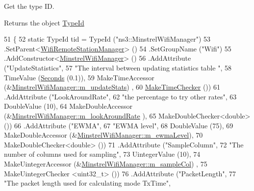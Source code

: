 Get the type ID. 

\begin{DoxyReturn}{Returns}
the object \hyperlink{classns3_1_1TypeId}{Type\+Id} 
\end{DoxyReturn}

\begin{DoxyCode}
51 \{
52   \textcolor{keyword}{static} TypeId tid = TypeId (\textcolor{stringliteral}{"ns3::MinstrelWifiManager"})
53     .SetParent<\hyperlink{classns3_1_1WifiRemoteStationManager_a78524840f5900e1937e8e2d6df48954d}{WifiRemoteStationManager}> ()
54     .SetGroupName (\textcolor{stringliteral}{"Wifi"})
55     .AddConstructor<\hyperlink{classns3_1_1MinstrelWifiManager_aabb10b7ccc2f7298fe491b00880954f4}{MinstrelWifiManager}> ()
56     .AddAttribute (\textcolor{stringliteral}{"UpdateStatistics"},
57                    \textcolor{stringliteral}{"The interval between updating statistics table "},
58                    TimeValue (\hyperlink{group__timecivil_ga33c34b816f8ff6628e33d5c8e9713b9e}{Seconds} (0.1)),
59                    MakeTimeAccessor (&\hyperlink{classns3_1_1MinstrelWifiManager_abd6d6339afd6875826c0ffa11297ad65}{MinstrelWifiManager::m\_updateStats})
      ,
60                    \hyperlink{group__time_ga7032965bd4afa578691d88c09e4481c1}{MakeTimeChecker} ())
61     .AddAttribute (\textcolor{stringliteral}{"LookAroundRate"},
62                    \textcolor{stringliteral}{"the percentage to try other rates"},
63                    DoubleValue (10),
64                    MakeDoubleAccessor (&\hyperlink{classns3_1_1MinstrelWifiManager_aebf6e38fb43af62f59490829d46e0e1d}{MinstrelWifiManager::m\_lookAroundRate}
      ),
65                    MakeDoubleChecker<double> ())
66     .AddAttribute (\textcolor{stringliteral}{"EWMA"},
67                    \textcolor{stringliteral}{"EWMA level"},
68                    DoubleValue (75),
69                    MakeDoubleAccessor (&\hyperlink{classns3_1_1MinstrelWifiManager_a528f4990b2e92f3b38ee1a4f764f0166}{MinstrelWifiManager::m\_ewmaLevel}),
70                    MakeDoubleChecker<double> ())
71     .AddAttribute (\textcolor{stringliteral}{"SampleColumn"},
72                    \textcolor{stringliteral}{"The number of columns used for sampling"},
73                    UintegerValue (10),
74                    MakeUintegerAccessor (&\hyperlink{classns3_1_1MinstrelWifiManager_a2112a731d89b8cd936a7f659aa678a15}{MinstrelWifiManager::m\_sampleCol})
      ,
75                    MakeUintegerChecker <uint32\_t> ())
76     .AddAttribute (\textcolor{stringliteral}{"PacketLength"},
77                    \textcolor{stringliteral}{"The packet length used for calculating mode TxTime"},

\end{DoxyCode}
